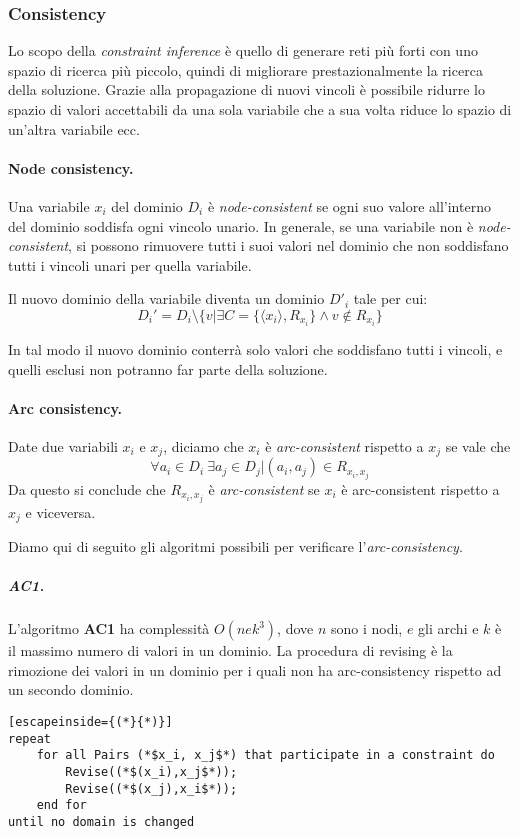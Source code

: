 \documentclass[a4paper, 11pt]{article}
\begin{document}
\subsubsection{Consistency}
Lo scopo della \textit{constraint inference} è  quello di generare reti più forti con uno spazio di ricerca più piccolo, quindi di migliorare prestazionalmente la ricerca della soluzione. Grazie alla propagazione di nuovi vincoli è possibile ridurre lo spazio di valori accettabili da una sola variabile che a sua volta riduce lo spazio di un'altra variabile ecc.

\paragraph{Node consistency.} Una variabile $x_i$ del dominio $D_i$ è \textit{node-consistent} se ogni suo valore all'interno del dominio soddisfa ogni vincolo unario. In generale, se una variabile non è \textit{node-consistent}, si possono rimuovere tutti i suoi valori nel dominio che non soddisfano tutti i vincoli unari per quella variabile. 

Il nuovo dominio della variabile diventa un dominio $D'_i$ tale per cui: \[ D_i' = D_i \setminus \lbrace v \vert \exists C = \lbrace \langle x_i \rangle, R_{x_i} \rbrace \wedge v \notin R_{x_i}  \rbrace\]

In tal modo il nuovo dominio conterrà solo valori che soddisfano tutti i vincoli, e quelli esclusi non potranno far parte della soluzione.

\paragraph{Arc consistency.} Date due variabili $x_i$ e $x_j$, diciamo che $x_i$ è \textit{arc-consistent} rispetto a $x_j$ se vale che \[ \forall a_i \in D_i\ \exists a_j \in D_j \vert (a_i, a_j) \in R_{x_i, x_j} \]
Da questo si conclude che $R_{x_i, x_j}$ è  \textit{arc-consistent} se $x_i$ è arc-consistent rispetto a $x_j$ e viceversa.

Diamo qui di seguito gli algoritmi possibili per verificare l'\textit{arc-consistency}.
\subparagraph{AC1.}L'algoritmo \textbf{AC1} ha complessità $O(nek^3)$, dove $n$ sono i nodi, $e$ gli archi e $k$ è il massimo numero di valori in un dominio. La procedura di revising è la rimozione dei valori in un dominio per i quali non ha arc-consistency rispetto ad un secondo dominio.

\begin{lstlisting}[escapeinside={(*}{*)}]
repeat
	for all Pairs (*$x_i, x_j$*) that participate in a constraint do
		Revise((*$(x_i),x_j$*));
		Revise((*$(x_j),x_i$*));
	end for
until no domain is changed
	\end{lstlisting}
	
\end{document}
